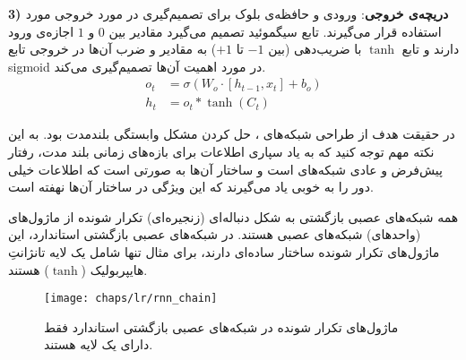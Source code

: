 \textbf{3) دریچه‌ی خروجی}:
ورودی و حافظه‌ی بلوک برای تصمیم‌گیری در مورد خروجی مورد استفاده قرار می‌گیرند. تابع سیگموئید تصمیم می‌گیرد مقادیر بین $0$ و $1$ اجازه‌ی ورود دارند و تابع $\tanh$ با ضریب‌دهی (بین $-1$ تا $+1$) به مقادیر و ضرب آن‌ها در خروجی تابع \gls{sigmoid} در مورد اهمیت آن‌ها تصمیم‌گیری می‌کند.
\begin{equation}
	\begin{aligned}
		o_t &= \sigma (W_o \cdot [h_{t-1}, x_t]+b_o)
		\\
		h_t &= o_t \ast \tanh(C_t)
	\end{aligned}
	\label{eq:ch_lr:lstm_out}
\end{equation}

در حقیقت هدف از طراحی شبکه‌های ، حل کردن مشکل وابستگی بلندمدت بود. به این نکته مهم توجه کنید که به یاد سپاری اطلاعات برای بازه‌های زمانی بلند مدت، رفتار پیش‌فرض و عادی شبکه‌های  است و ساختار آ‌ن‌ها به صورتی است که اطلاعات خیلی دور را به خوبی یاد می‌گیرند که این ویژگی در ساختار آن‌ها نهفته است.

همه شبکه‌های عصبی بازگشتی به شکل دنباله‌ای (زنجیره‌ای) تکرار شونده از ماژول‌های (واحد‌های) شبکه‌های عصبی هستند. در شبکه‌های عصبی بازگشتی استاندارد، این ماژول‌های تکرار شونده ساختار ساده‌ای دارند، برای مثال تنها شامل یک لایه تانژانتِ هایپربولیک ($\tanh$) هستند.

\begin{figure}[!ht]
	\centerline{\texttt{[image: chaps/lr/rnn\_chain]}}
	\caption{
		ماژول‌های تکرار شونده در شبکه‌های عصبی بازگشتی استاندارد فقط دارای یک لایه هستند.
	}
	\label{fig:ch_lr:rnn_chain}
\end{figure}

